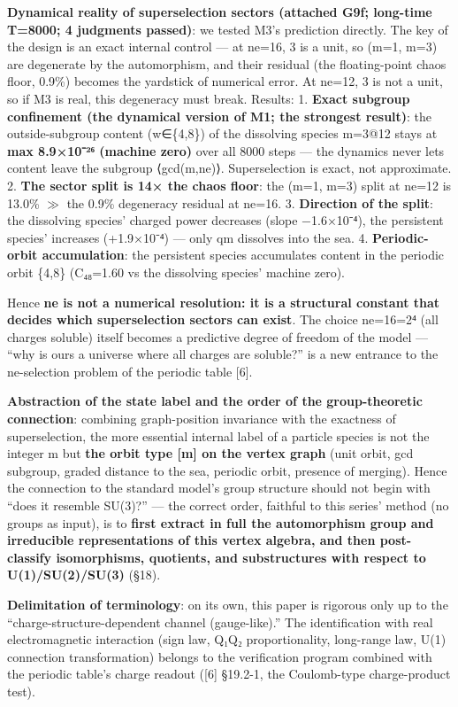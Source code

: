 \documentclass[
]{article}
\begin{document}
\textbf{Dynamical reality of superselection sectors (attached G9f;
long-time T=8000; 4 judgments passed)}: we tested M3's prediction
directly. The key of the design is an exact internal control --- at
ne=16, 3 is a unit, so (m=1, m=3) are degenerate by the automorphism,
and their residual (the floating-point chaos floor, 0.9\%) becomes the
yardstick of numerical error. At ne=12, 3 is not a unit, so if M3 is
real, this degeneracy must break. Results: 1. \textbf{Exact subgroup
confinement (the dynamical version of M1; the strongest result)}: the
outside-subgroup content (w∈\{4,8\}) of the dissolving species m=3@12
stays at \textbf{max 8.9×10⁻²⁶ (machine zero)} over all 8000 steps ---
the dynamics never lets content leave the subgroup ⟨gcd(m,ne)⟩.
Superselection is exact, not approximate. 2. \textbf{The sector split is
14× the chaos floor}: the (m=1, m=3) split at ne=12 is 13.0\% \(\gg\)
the 0.9\% degeneracy residual at ne=16. 3. \textbf{Direction of the
split}: the dissolving species' charged power decreases (slope
−1.6×10⁻⁴), the persistent species' increases (+1.9×10⁻⁴) --- only
q\textbar m dissolves into the sea. 4. \textbf{Periodic-orbit
accumulation}: the persistent species accumulates content in the
periodic orbit \{4,8\} (C₄₈=1.60 vs the dissolving species' machine
zero).

Hence \textbf{ne is not a numerical resolution: it is a structural
constant that decides which superselection sectors can exist}. The
choice ne=16=2⁴ (all charges soluble) itself becomes a predictive degree
of freedom of the model --- ``why is ours a universe where all charges
are soluble?'' is a new entrance to the ne-selection problem of the
periodic table {[}6{]}.

\textbf{Abstraction of the state label and the order of the
group-theoretic connection}: combining graph-position invariance with
the exactness of superselection, the more essential internal label of a
particle species is not the integer m but \textbf{the orbit type {[}m{]}
on the vertex graph} (unit orbit, gcd subgroup, graded distance to the
sea, periodic orbit, presence of merging). Hence the connection to the
standard model's group structure should not begin with ``does it
resemble SU(3)?'' --- the correct order, faithful to this series' method
(no groups as input), is to \textbf{first extract in full the
automorphism group and irreducible representations of this vertex
algebra, and then post-classify isomorphisms, quotients, and
substructures with respect to U(1)/SU(2)/SU(3)} (§18).

\textbf{Delimitation of terminology}: on its own, this paper is rigorous
only up to the ``charge-structure-dependent channel (gauge-like).'' The
identification with real electromagnetic interaction (sign law, Q₁Q₂
proportionality, long-range law, U(1) connection transformation) belongs
to the verification program combined with the periodic table's charge
readout ({[}6{]} §19.2-1, the Coulomb-type charge-product test).
\end{document}
